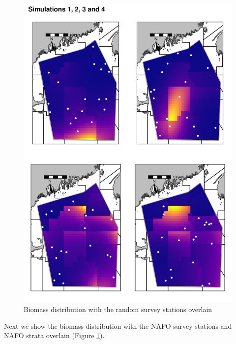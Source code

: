 \documentclass[
]{article}
\begin{document}
\begin{figure}
\centering
\includegraphics{Survey_tutortial_files/figure-latex/rand-samp-plt-1.pdf}
\caption{\label{fig:rand-samp-plt}Biomass distribution with the random survey stations overlain}
\end{figure}

Next we show the biomass distribution with the NAFO survey stations and NAFO strata overlain (Figure \ref{fig:rand-samp-plt}).
\end{document}
